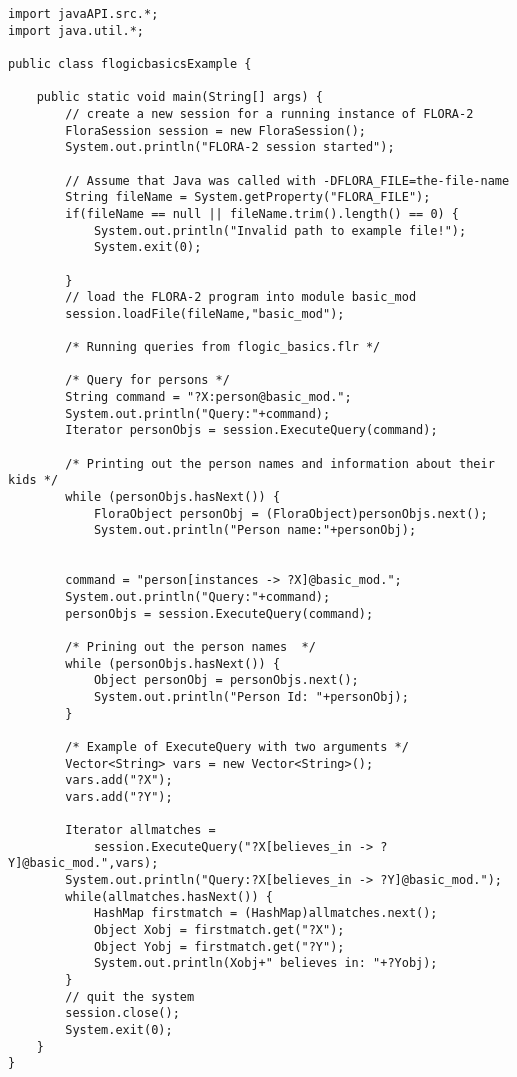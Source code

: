 \begin{verbatim}
import javaAPI.src.*;
import java.util.*;

public class flogicbasicsExample {

    public static void main(String[] args) {
        // create a new session for a running instance of FLORA-2
        FloraSession session = new FloraSession();
        System.out.println("FLORA-2 session started");

        // Assume that Java was called with -DFLORA_FILE=the-file-name
        String fileName = System.getProperty("FLORA_FILE");
        if(fileName == null || fileName.trim().length() == 0) {
            System.out.println("Invalid path to example file!");
            System.exit(0);

        }
        // load the FLORA-2 program into module basic_mod
        session.loadFile(fileName,"basic_mod");

        /* Running queries from flogic_basics.flr */

        /* Query for persons */
        String command = "?X:person@basic_mod.";
        System.out.println("Query:"+command);
        Iterator personObjs = session.ExecuteQuery(command);

        /* Printing out the person names and information about their kids */
        while (personObjs.hasNext()) {
            FloraObject personObj = (FloraObject)personObjs.next();
            System.out.println("Person name:"+personObj);


        command = "person[instances -> ?X]@basic_mod.";
        System.out.println("Query:"+command);
        personObjs = session.ExecuteQuery(command);

        /* Prining out the person names  */
        while (personObjs.hasNext()) {
            Object personObj = personObjs.next();
            System.out.println("Person Id: "+personObj);
        }

        /* Example of ExecuteQuery with two arguments */
        Vector<String> vars = new Vector<String>();
        vars.add("?X");
        vars.add("?Y");

        Iterator allmatches =
            session.ExecuteQuery("?X[believes_in -> ?Y]@basic_mod.",vars);
        System.out.println("Query:?X[believes_in -> ?Y]@basic_mod.");
        while(allmatches.hasNext()) {
            HashMap firstmatch = (HashMap)allmatches.next();
            Object Xobj = firstmatch.get("?X");
            Object Yobj = firstmatch.get("?Y");
            System.out.println(Xobj+" believes in: "+?Yobj);
        }
        // quit the system
        session.close();
        System.exit(0);
    }
}
\end{verbatim}

